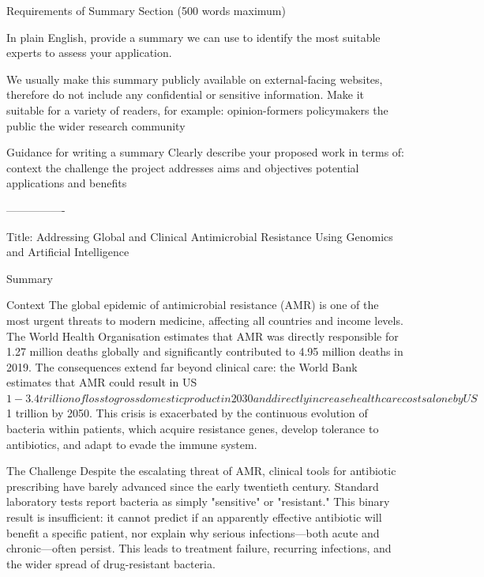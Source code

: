 
Requirements of Summary Section (500 words maximum)

In plain English, provide a summary we can use to identify the most suitable experts to assess your application.

We usually make this summary publicly available on external-facing websites, therefore do not include any confidential or sensitive information. Make it suitable for a variety of readers, for example:
opinion-formers
policymakers
the public
the wider research community

Guidance for writing a summary
Clearly describe your proposed work in terms of:
context
the challenge the project addresses
aims and objectives
potential applications and benefits

----------------

Title:
Addressing Global and Clinical Antimicrobial Resistance Using Genomics and Artificial Intelligence

Summary

Context 
The global epidemic of antimicrobial resistance (AMR) is one of the most urgent threats to modern medicine, affecting all countries and income levels. The World Health Organisation estimates that AMR was directly responsible for 1.27 million deaths globally and significantly contributed to 4.95 million deaths in 2019. The consequences extend far beyond clinical care: the World Bank estimates that AMR could result in US $1 - 3.4 trillion of loss to gross domestic product in 2030 and directly increase healthcare costs alone by US $1 trillion by 2050. This crisis is exacerbated by the continuous evolution of bacteria within patients, which acquire resistance genes, develop tolerance to antibiotics, and adapt to evade the immune system.

The Challenge
Despite the escalating threat of AMR, clinical tools for antibiotic prescribing have barely advanced since the early twentieth century. Standard laboratory tests report bacteria as simply "sensitive" or "resistant." This binary result is insufficient: it cannot predict if an apparently effective antibiotic will benefit a specific patient, nor explain why serious infections—both acute and chronic—often persist. This leads to treatment failure, recurring infections, and the wider spread of drug-resistant bacteria.

